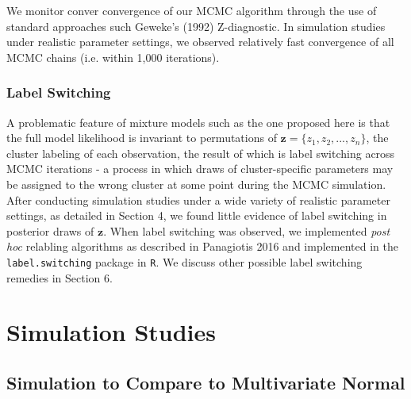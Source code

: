 \documentclass[useAMS,referee]{biom}
\begin{document}
We monitor conver convergence of our MCMC algorithm through the use of standard approaches such Geweke's (1992) Z-diagnostic. In simulation studies under realistic parameter settings, we observed relatively fast convergence of all MCMC chains (i.e. within 1,000 iterations).

\subsubsection{Label Switching}

A problematic feature of mixture models such as the one proposed here is that the full model likelihood is invariant to permutations of $\mathbf{z} = \{ z_1, z_2,..., z_n \}$, the cluster labeling of each observation, the result of which is label switching across MCMC iterations - a process in which draws of cluster-specific parameters may be assigned to the wrong cluster at some point during the MCMC simulation. After conducting simulation studies under a wide variety of realistic parameter settings, as detailed in Section 4, we found little evidence of label switching in posterior draws of $\mathbf{z}$. When label switching was observed, we implemented \textit{post hoc} relabling algorithms as described in Panagiotis 2016 and implemented in the \texttt{label.switching} package in \texttt{R}. We discuss other possible label switching remedies in Section 6. 

\newpage

\section{Simulation Studies}
\label{s:sim}

\subsection{Simulation to Compare to Multivariate Normal}
\end{document}
